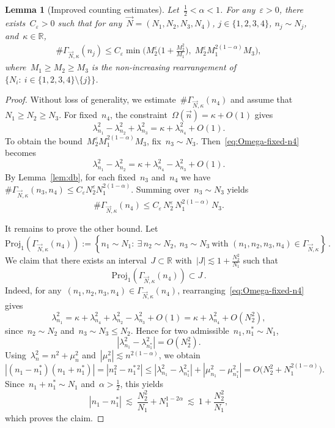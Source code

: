 \documentclass[11pt,reqno,english]{amsart}
\numberwithin{equation}{section}
\theoremstyle{plain}
\newtheorem{lemma}[theorem]{Lemma}
\theoremstyle{definition}
\theoremstyle{remark}
\newcommand{\R}{\mathbb{R}}
\begin{document}
\begin{lemma}[Improved counting estimates]\label{improvedcounting}
	Let~$\frac{1}{2}< \alpha< 1$. For any~$\varepsilon>0$, there exists~$C_{\varepsilon}>0$ such that
	for any~$\vec{N}=(N_1,N_2,N_3,N_4)$, $j\in\{1,2,3,4\}$, $n_j\sim N_j$, and~$\kappa\in\R$,
	\begin{align}\label{improvedcounting1}
		\#\Gamma_{\vec{N},\kappa}(n_j)\leq C_{\varepsilon}
		\min\Big(M_2^{\varepsilon}\Big(1+\frac{M_{2}^{2}}{M_{1}}\Big),\;
		M_2^{\varepsilon}M_{1}^{2(1-\alpha)}M_{3} \Big),
	\end{align}
	where~$M_1\geq M_2\geq M_3$ is the non-increasing rearrangement of~$\{N_i:\ i\in\{1,2,3,4\}\setminus\{j\}\}$.
\end{lemma}

\begin{proof}
	Without loss of generality, we estimate~$\#\Gamma_{\vec{N},\kappa}(n_4)$ and assume that~$N_1\geq N_2\geq N_3$. For fixed~$n_4$, the constraint~$\Omega(\vec{n})=\kappa+O(1)$ gives
	\begin{equation}\label{eq:Omega-fixed-n4}
		\lambda_{n_1}^2-\lambda_{n_2}^2+\lambda_{n_3}^2=\kappa+\lambda_{n_4}^2+O(1).
	\end{equation}
	To obtain the bound~$M_2^{\varepsilon}M_1^{2(1-\alpha)}M_3$, fix~$n_3\sim N_3$. Then~\eqref{eq:Omega-fixed-n4} becomes
	\[
	\lambda_{n_1}^2-\lambda_{n_2}^2=\kappa+\lambda_{n_4}^2-\lambda_{n_3}^2+O(1).
	\]
	By Lemma~\ref{lem:db}, for each fixed~$n_3$ and~$n_4$ we have~$\#\Gamma_{\vec{N},\kappa}(n_3,n_4)\le C_\varepsilon N_2^\varepsilon N_1^{2(1-\alpha)}$.
	Summing over~$n_3\sim N_3$ yields
	\[
	\#\Gamma_{\vec{N},\kappa}(n_4)\le C_\varepsilon\,N_2^\varepsilon\,N_1^{2(1-\alpha)}\,N_3.
	\]

	It remains to prove the other bound. Let
	\[
	\mathrm{Proj}_1(\Gamma_{\vec{N},\kappa}(n_4))
	:=\left\{n_1\sim N_1:\ \exists\,n_2\sim N_2,\ n_3\sim N_3\ \text{with } (n_1,n_2,n_3,n_4)\in\Gamma_{\vec{N},\kappa}
	\right\}\,.
	\]
	We claim that there exists an interval~$J\subset\R$ with~$|J|\lesssim 1+\frac{N_2^2}{N_1}$ such that
	\[
	\mathrm{Proj}_1(\Gamma_{\vec{N},\kappa}(n_4))\subset J\,.
	\]
	Indeed, for any~$(n_1,n_2,n_3,n_4)\in\Gamma_{\vec{N},\kappa}(n_4)$, rearranging~\eqref{eq:Omega-fixed-n4} gives
	\[
	\lambda_{n_1}^2=\kappa+\lambda_{n_4}^2+\lambda_{n_2}^2-\lambda_{n_3}^2+O(1)
	=\kappa+\lambda_{n_4}^2+O(N_2^2),
	\]
	since~$n_2\sim N_2$ and~$n_3\sim N_3\le N_2$. Hence for two admissible~$n_1,n_1^\ast\sim N_1$,
	\[
	|\lambda_{n_1}^2-\lambda_{n_1^\ast}^2|=O(N_2^2).
	\]
	Using~$\lambda_n^2=n^2+\mu_n^2$ and~$|\mu_n^2|\lesssim n^{2(1-\alpha)}$, we obtain
	\[
	|(n_1-n_1^\ast)(n_1+n_1^\ast)|
	=|n_1^2-n_1^{\ast\,2}|
	\le |\lambda_{n_1}^2-\lambda_{n_1^\ast}^2|+|\mu_{n_1}^2-\mu_{n_1^\ast}^2|
	=O\big(N_2^2+N_1^{2(1-\alpha)}\big).
	\]
	Since~$n_1+n_1^\ast\sim N_1$ and~$\alpha>\frac12$, this yields
	\[
	|n_1-n_1^\ast|\ \lesssim\ \frac{N_2^2}{N_1}+N_1^{1-2\alpha}
	\ \lesssim\ 1+\frac{N_2^2}{N_1},
	\]
	which proves the claim.


\end{proof}
\end{document}
